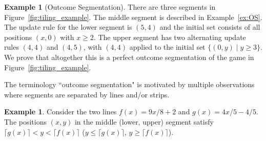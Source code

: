 \documentclass{amsart}
\theoremstyle{plain}
\theoremstyle{definition}
\newtheorem{example}[thm]{Example}
\renewcommand{\ge}{\geqslant}
\renewcommand{\le}{\leqslant}
\begin{document}
   \begin{example}[Outcome Segmentation]\label{ex:titlingex}
       There are three segments in Figure~\ref{fig:tiling_example}. The middle segment is described in Example~\ref{ex:OS}. The update rule for the lower segment is $(5,4)$ and the initial set consists of all positions $(x,0)$ with $x\ge 2$. The upper segment has two alternating update rules $(4,4)$ and $(4,5)$, with $(4,4)$ applied to the initial set $\{(0,y)\mid y\ge 3\}$. We prove that altogether this is a perfect outcome segmentation of the game in Figure~\ref{fig:tiling_example}.
   \end{example}
   The terminology ``outcome segmentation" is motivated by multiple observations where segments are separated by lines and/or strips.  
\begin{example}\label{ex:lines}
Consider the two lines $f(x)=9x/8+2$ and $g(x)=4x/5-4/5$. The positions $(x,y)$ in the middle (lower, upper) segment satisfy $\lceil g(x)\rceil < y <  \lceil f(x)\rceil $ ($y\le \lceil g(x)\rceil $, $y\ge \lceil f(x)\rceil $). 
\end{example}
\end{document}
